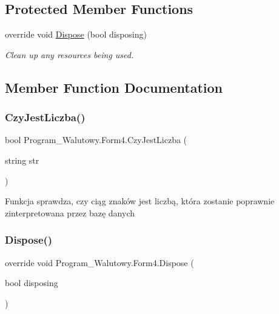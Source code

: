 \subsection*{Protected Member Functions}
\begin{DoxyCompactItemize}
\item 
override void \mbox{\hyperlink{class_program___walutowy_1_1_form4_a8399759020f923ced13c078eccd3a950}{Dispose}} (bool disposing)
\begin{DoxyCompactList}\small\item\em Clean up any resources being used. \end{DoxyCompactList}\end{DoxyCompactItemize}


\subsection{Member Function Documentation}
\mbox{\label{class_program___walutowy_1_1_form4_ad2f3b1fb24bb14c5a3fd9790dc7c517f}} 
\subsubsection{\texorpdfstring{CzyJestLiczba()}{CzyJestLiczba()}}
{\footnotesize\ttfamily bool Program\+\_\+\+Walutowy.\+Form4.\+Czy\+Jest\+Liczba (\begin{DoxyParamCaption}\item[{string}]{str }\end{DoxyParamCaption})}

Funkcja sprawdza, czy ciąg znaków jest liczbą, która zostanie poprawnie zinterpretowana przez bazę danych \mbox{\label{class_program___walutowy_1_1_form4_a8399759020f923ced13c078eccd3a950}} 
\subsubsection{\texorpdfstring{Dispose()}{Dispose()}}
{\footnotesize\ttfamily override void Program\+\_\+\+Walutowy.\+Form4.\+Dispose (\begin{DoxyParamCaption}\item[{bool}]{disposing }\end{DoxyParamCaption})\hspace{0.3cm}{\ttfamily [protected]}}



